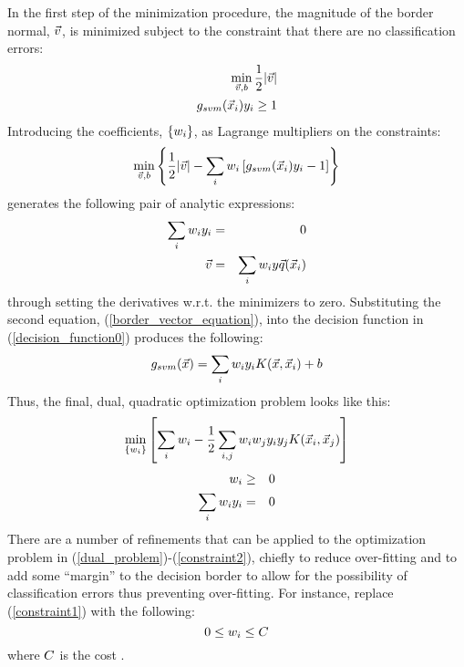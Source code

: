 \documentclass{article}
\newenvironment{eqnnon}{\begin{equation*}}{\end{equation*}}
\newenvironment{eqnarraynon}{\begin{eqnarray*}}{\end{eqnarray*}}
\begin{document}
In the first step of the minimization procedure, 
the magnitude of the border normal, $\vec v$, 
is minimized subject to the constraint that there are no classification 
errors:
\begin{eqnarraynon}
	\min_{\svmbordernormal, \svmborderconst} \frac{1}{2} | \svmbordernormal | \\ \nonumber
	\svmdecision(\sample_i) \classlabel_i \ge 1
\end{eqnarraynon}
Introducing the coefficients, $\lbrace w_i \rbrace$, 
as Lagrange multipliers on the constraints:
\begin{eqnnon}
	\min_{\svmbordernormal, b} \left \lbrace \frac{1}{2} | \svmbordernormal | - \sum_i \svmcoeff_i \left [ \svmdecision(\sample_i) \classlabel_i -1 \right ] \right \rbrace
\end{eqnnon}
generates the following pair of analytic expressions:
\begin{eqnarray}
	\sum_i w_i y_i & = & 0 \nonumber \\
	\vec v & = & \sum_i w_i y \vec q(\vec {x}_i) \label{border_vector_equation}
\end{eqnarray}
through setting the derivatives w.r.t. the minimizers to zero.
Substituting the second equation, (\ref{border_vector_equation}),
into the decision function in (\ref{decision_function0}) produces the following:
\begin{equation}
	g_{svm}(\vec {x}) = \sum_i w_i y_i K (\vec {x}, \vec {x}_i) + b
	\label{svm_decision}
\end{equation}
Thus, the final, dual, quadratic optimization problem looks like this:
\begin{equation}
	\min_{\lbrace w_i \rbrace} \left [ \sum_i w_i 
	- \frac{1}{2} \sum_{i, j} w_i w_j y_i y_j K(\vec {x}_i, \vec {x}_j) \right ] \label{dual_problem}
\end{equation}
\begin{eqnarray}
	w_i & \ge & 0 \label{constraint1} \\
	\sum_i w_i y_i & = & 0 \label{constraint2}
\end{eqnarray}
There are a number of refinements that can be applied to the optimization
problem in (\ref{dual_problem})-(\ref{constraint2}), chiefly to reduce over-fitting and to add
some ``margin'' to the decision border to allow for the possibility of
classification errors thus preventing over-fitting.
For instance, replace (\ref{constraint1}) with the following:
\begin{eqnnon}
 0 \le \svmcoeff_i \le \svmcost
 \label{svmcost}
\end{eqnnon}
where $C$ is the cost \citep{Mueller_etal2001}.
\end{document}
